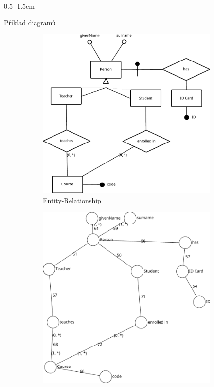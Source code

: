 \documentclass[a0paper]{uioposter}
\begin{document}
\begin{frame}
\begin{columns}[onlytextwidth]
\begin{column}{0.5\textwidth - 1.5cm}
      \begin{block}{Příklad diagramů}
        \begin{figure}
          \centering
          \begin{subfigure}{0.45\textwidth}
            \includegraphics[width=1\textwidth]{./images/university-er.pdf}
            \caption{Entity-Relationship}
            \label{fig:diagrams:er}
          \end{subfigure}
          \begin{subfigure}{0.45\textwidth}
            \includegraphics[width=\textwidth]{./images/university-schemcat.pdf}

\end{subfigure}
\end{figure}
\end{block}
\end{column}
\end{columns}
\end{frame}
\end{document}
